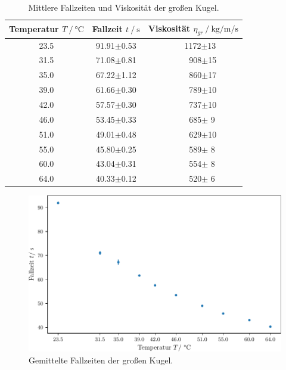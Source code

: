 \begin{table}[h]
    \centering
    \caption{Mittlere Fallzeiten und Viskosität der großen Kugel.}
    \label{tab:mess_grKugel_dyn}
    \begin{tabular}{c c l}
        \toprule
        {Temperatur $T\:/\:\si{\celsius}$} & {Fallzeit $t\:/\:\si{\second}$} & {Viskosität $\eta_{gr}\:/\:\si{\kilo\gram\per\meter\per\second}$} \\
        \midrule
        23.5 & 91.91$\pm$0.53 & $\qquad\qquad$   1172$\pm$13 \\
        31.5 & 71.08$\pm$0.81 & $\qquad\qquad\;\;$  908$\pm$15 \\
        35.0 & 67.22$\pm$1.12 & $\qquad\qquad\;\;$  860$\pm$17 \\
        39.0 & 61.66$\pm$0.30 & $\qquad\qquad\;\;$  789$\pm$10 \\
        42.0 & 57.57$\pm$0.30 & $\qquad\qquad\;\;$  737$\pm$10 \\
        46.0 & 53.45$\pm$0.33 & $\qquad\qquad\;\;$  685$\pm$ 9 \\
        51.0 & 49.01$\pm$0.48 & $\qquad\qquad\;\;$  629$\pm$10 \\
        55.0 & 45.80$\pm$0.25 & $\qquad\qquad\;\;$  589$\pm$ 8 \\
        60.0 & 43.04$\pm$0.31 & $\qquad\qquad\;\;$  554$\pm$ 8 \\
        64.0 & 40.33$\pm$0.12 & $\qquad\qquad\;\;$  520$\pm$ 6 \\
        \bottomrule
    \end{tabular}    
\end{table}

\begin{figure}
    \centering
    \includegraphics{plots/avg_gr.pdf}
    \caption{Gemittelte Fallzeiten der großen Kugel.}
    \label{fig:mittl_fall_gr}
\end{figure}

